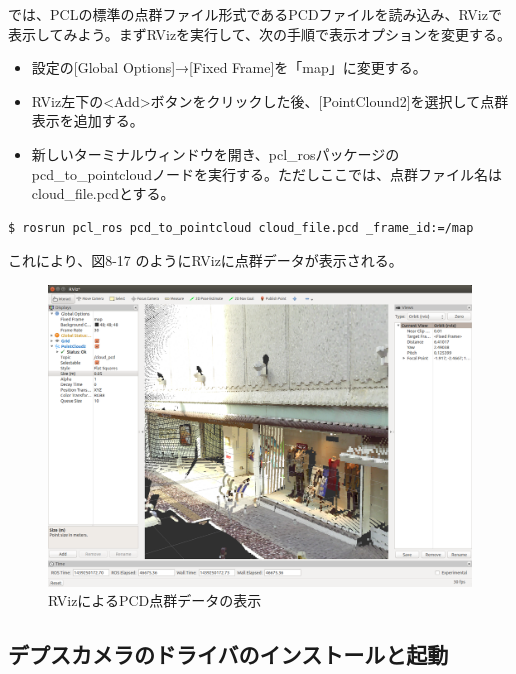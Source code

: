 では、PCLの標準の点群ファイル形式であるPCDファイルを読み込み、RVizで表示してみよう。まずRVizを実行して、次の手順で表示オプションを変更する。

\begin{itemize}
\item 設定の[Global Options]→[Fixed Frame]を「map」に変更する。
\item RViz左下の<Add>ボタンをクリックした後、[PointClound2]を選択して点群表示を追加する。
\item 新しいターミナルウィンドウを開き、pcl\_rosパッケージのpcd\_to\_pointcloudノードを実行する。ただしここでは、点群ファイル名はcloud\_file.pcdとする。
\end{itemize}

\begin{lstlisting}[language=ROS]
$ rosrun pcl_ros pcd_to_pointcloud cloud_file.pcd _frame_id:=/map
\end{lstlisting}

これにより、図8-17 のようにRVizに点群データが表示される。

\begin{figure}[htp]
  \centering
  \includegraphics[width=\columnwidth]{pictures/chapter8/pic_08_16.png}
  \caption{RVizによるPCD点群データの表示}
\end{figure}

\subsection{デプスカメラのドライバのインストールと起動}

